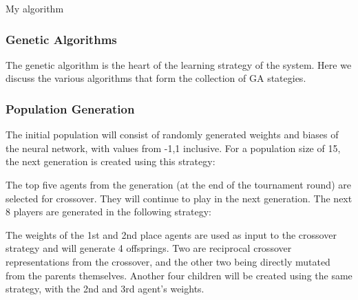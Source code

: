 \documentclass[12pt,a4paper]{article}
\makeatletter
\def\BState{\State\hskip-\ALG@thistlm}
\makeatother
\begin{document}
    \begin{algorithm}
        \caption{My algorithm}
    \end{algorithm}

    \cite{budgen}

\subsubsection{Genetic Algorithms} 

    The genetic algorithm is the heart of the learning strategy of the system. Here we discuss the various algorithms that form the collection of GA stategies.

\subsubsection{Population Generation}

    The initial population will consist of randomly generated weights and biases of the neural network, with values from -1,1 inclusive. For a population size of 15, the next generation is created using this strategy:

    The top five agents from the generation (at the end of the tournament round) are selected for crossover. They will continue to play in the next generation.
    The next 8 players are generated in the following strategy:

    The weights of the 1st and 2nd place agents are used as input to the crossover strategy and will generate 4 offsprings. Two are reciprocal crossover representations from the crossover, and the other two being directly mutated from the parents themselves. Another four children will be created using the same strategy, with the 2nd and 3rd agent's weights. 
\end{document}
